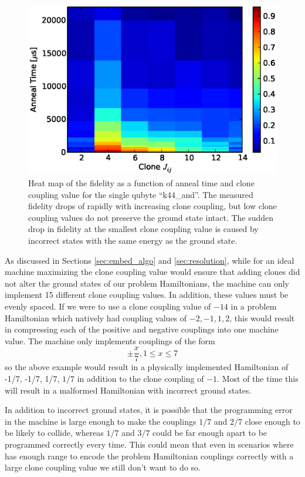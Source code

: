 \begin{figure}
	\includegraphics{img/n_8_t_v_c.eps}
	\caption[Variable Clone Coupling Fidelity]{Heat map of the fidelity as a function of anneal time and clone coupling value for the single qubyte ``k44\_and''.  The measured fidelity drops of rapidly with increasing clone coupling, but low clone coupling values do not preserve the ground state intact.  The sudden drop in fidelity at the smallest clone coupling value is caused by incorrect states with the same energy as the ground state.}
	\label{fig:clone_coupling}
\end{figure}

As discussed in Sections \ref{sec:embed_algo} and \ref{sec:resolution}, while for an ideal machine maximizing the clone coupling value would ensure that adding clones did not alter the ground states of our problem Hamiltonians, the \machine machine can only implement 15 different clone coupling values.  In addition, these values must be evenly spaced.  If we were to use a clone coupling value of $-14$ in a problem Hamiltonian which natively had coupling values of $-2,-1,1,2$, this would result in compressing each of the positive and negative couplings into one machine value.  The machine only implements couplings of the form 
\begin{equation}
	\pm\frac{x}{7}, 1 \le x \le 7
\end{equation}
so the above example would result in a physically implemented Hamiltonian of -1/7, -1/7, 1/7, $1/7$ in addition to the clone coupling of $-1$.  Most of the time this will result in a malformed Hamiltonian with incorrect ground states.

In addition to incorrect ground states, it is possible that the programming error in the machine is large enough to make the couplings $1/7$ and $2/7$ close enough to be likely to collide, whereas $1/7$ and $3/7$ could be far enough apart to be programmed correctly every time.  This could mean that even in scenarios where \machine has enough range to encode the problem Hamiltonian couplings correctly with a large clone coupling value we still don't want to do so.

